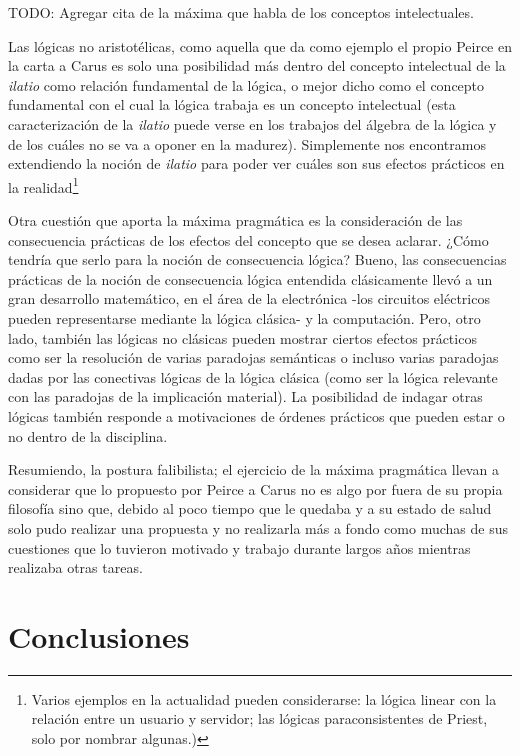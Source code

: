 \documentclass[
  structure  = article,
  pagelayout = periodicalaureo,%
  secfont    = italic,
  subsecfont = italic,
  version    = final,%
]{suftesi}
\begin{document}
TODO: Agregar cita de la máxima que habla de los conceptos intelectuales.

Las lógicas no aristotélicas, como aquella que da como ejemplo el propio Peirce en la carta a Carus es solo una posibilidad más dentro del concepto intelectual de la \emph{ilatio} como relación fundamental de la lógica, o mejor dicho como el concepto fundamental con el cual la lógica trabaja es un concepto intelectual (esta caracterización de la \emph{ilatio} puede verse en los trabajos del álgebra de la lógica \cite{peirce1880, peirce1885} y de los cuáles no se va a oponer en la madurez). Simplemente nos encontramos extendiendo la noción de \emph{ilatio} para poder ver cuáles son sus efectos prácticos en la realidad\footnote{Varios ejemplos en la actualidad pueden considerarse: la lógica linear con la relación entre un usuario y servidor; las lógicas paraconsistentes de Priest, solo por nombrar algunas.)}

Otra cuestión que aporta la máxima pragmática es la consideración de las consecuencia prácticas de los efectos del concepto que se desea aclarar. ¿Cómo tendría que serlo para la noción de consecuencia lógica? Bueno, las consecuencias prácticas de la noción de consecuencia lógica entendida clásicamente llevó a un gran desarrollo matemático, en el área de la electrónica -los circuitos eléctricos pueden representarse mediante la lógica clásica- y la computación. Pero, otro lado, también las lógicas no clásicas pueden mostrar ciertos efectos prácticos como ser la resolución de varias paradojas semánticas o incluso varias paradojas dadas por las conectivas lógicas de la lógica clásica (como ser la lógica relevante con las paradojas de la implicación material). La posibilidad de indagar otras lógicas también responde a motivaciones de órdenes prácticos que pueden estar o no dentro de la disciplina.

Resumiendo, la postura falibilista; el ejercicio de la máxima pragmática llevan a considerar que lo propuesto por Peirce a Carus no es algo por fuera de su propia filosofía sino que, debido al poco tiempo que le quedaba y a su estado de salud solo pudo realizar una propuesta y no realizarla más a fondo como muchas de sus cuestiones que lo tuvieron motivado y trabajo durante largos años mientras realizaba otras tareas.

\section{Conclusiones} %
\label{sec:Conclusiones}
\end{document}
